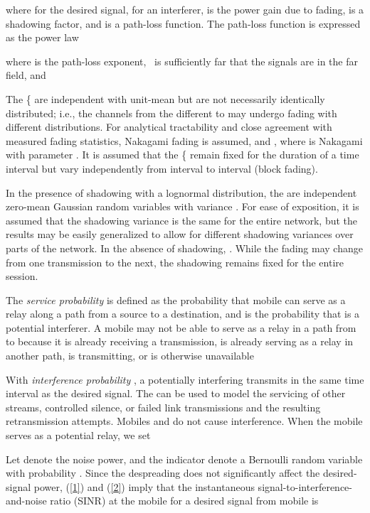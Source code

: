 \documentclass[conference]{IEEEtran}
\begin{document}
where  for the desired signal,  for an interferer,  is the power gain due to fading,
 is a shadowing factor, and  is a path-loss function. The
path-loss function is expressed as the power law

where  is the path-loss exponent, \ is sufficiently far
that the signals are in the far field, and 

The \{ are independent with unit-mean but are not necessarily
identically distributed; i.e., the channels from the different  to
 may undergo fading with different distributions. For analytical
tractability and close agreement with measured fading statistics, Nakagami
fading is assumed, and , where  is Nakagami with
parameter . It is assumed that the \{ remain fixed for the
duration of a time interval but vary independently from interval to interval
(block fading).

In the presence of shadowing with a lognormal distribution, the  are independent zero-mean Gaussian random variables with variance
. For ease of exposition, it is assumed that the shadowing
variance is the same for the entire network, but the results may be easily
generalized to allow for different shadowing variances over parts of the
network. In the absence of shadowing, . While the fading may
change from one transmission to the next, the shadowing remains fixed for the
entire session.

The \emph{service probability}  is defined as the probability that
mobile  can serve as a relay along a path from a source to a
destination, and  is the probability that  is a potential
interferer.  A mobile may not be able to
serve as a relay in a path from  to 
because it
is already receiving a transmission, is already serving as
a relay in another path, is transmitting, or is otherwise
unavailable


With \emph{interference probability} , a potentially interfering 
transmits in the same time interval as the desired signal. The  can
be used to model the servicing of other streams, controlled silence, or failed
link transmissions and the resulting retransmission attempts. Mobiles 
and  do not cause interference. When the mobile  serves as a
potential relay, we set 

Let  denote the noise power, and the indicator  denote a
Bernoulli random variable with probability . Since the
despreading does not significantly affect the desired-signal power, (\ref{1})
and (\ref{2}) imply that the instantaneous signal-to-interference-and-noise
ratio (SINR) at the mobile  for a desired signal from mobile
 is
\end{document}
